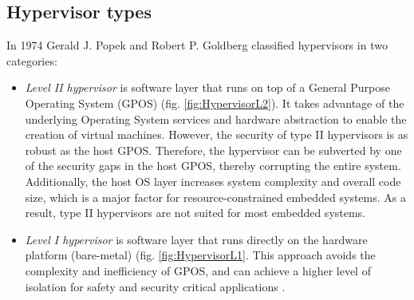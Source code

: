 \subsection{Hypervisor types}
In 1974 Gerald J. Popek and Robert P. Goldberg \cite{popek1974formal} classified hypervisors in two categories:
\begin{itemize}
\item \emph{Level II hypervisor} is software layer that runs on top of a General Purpose Operating System (GPOS) \cite{Kleidermacher2013} (fig. \ref{fig:HypervisorL2}). It takes advantage of the underlying Operating System services and hardware abstraction to enable the creation of virtual machines. However, the security of type II hypervisors is as robust as the host GPOS. Therefore, the hypervisor can be subverted by one of the security gaps in the host GPOS, thereby corrupting the entire system. Additionally, the host OS layer increases system complexity and overall code size, which is a major factor for resource-constrained embedded systems. As a result, type II hypervisors are not suited for most embedded systems.
\item \emph{Level I hypervisor} is software layer that runs directly on the hardware platform (bare-metal) (fig. \ref{fig:HypervisorL1}. This approach avoids the complexity and inefficiency of GPOS, and can achieve a higher level of isolation for safety and security critical applications \cite{Kleidermacher2013}.
\end{itemize}

